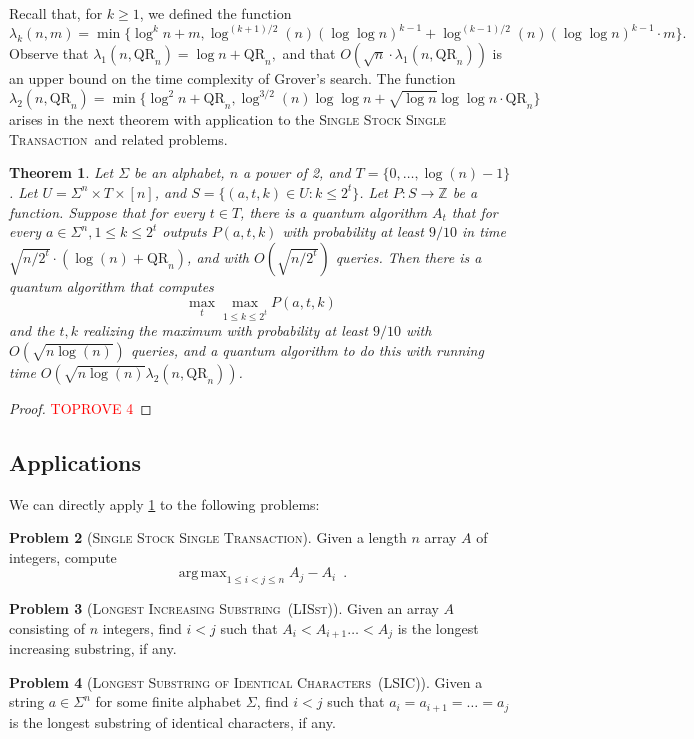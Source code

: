 \documentclass[12pt]{article}
\newcommand{\qr}{\mathrm{QR}}
\newcommand{\Z}{\mathbb{Z}}
\DeclareMathOperator*{\argmax}{arg\,max}
\newcommand{\SSSTf}{\textsc{Single Stock Single Transaction}}
\newcommand{\LSICf}{\textsc{Longest Substring of Identical Characters}}
\newcommand{\LSIC}{\textsc{LSIC}}
\newcommand{\LISstf}{\textsc{Longest Increasing Substring}}
\newcommand{\LISst}{\textsc{LISst}}
\newtheorem{theorem}{Theorem}
\theoremstyle{definition}
\newtheorem{problem}[theorem]{Problem}
\begin{document}
Recall that, for $k \geq 1$, we defined the function
\[
\lambda_k (n, m) = \min \{\log^k n + m, \log^{(k+1)/2} (n) (\log \log n)^{k-1} + \log^{(k-1)/2} (n) (\log \log n)^{k-1} \cdot m \}.
\]
Observe that  $\lambda_1 (n, \qr_n) =  \log n + \qr_n,$ and that $O(\sqrt{n} \cdot \lambda_1 (n, \qr_n) )$ is an upper bound on the time complexity of Grover's search.
The function 
\[
\lambda_2 (n, \qr_n) = \min \{\log^2 n + \qr_n , \log^{3/2} (n) \log \log n + \sqrt{\log n} \log \log n \cdot \qr_n \}
\]
arises in the next theorem with application to the \SSSTf \ and related problems.
\begin{theorem}
\label{thm:bu_rootn}
Let $\Sigma$ be an alphabet, $n$ a power of 2, and $T = \{0, \ldots, \log(n) - 1\}$.
Let $U = \Sigma^n \times T \times [n]$, and $S = \{(a, t, k) \in U : k \le 2^t\}$.
Let $P : S \rightarrow \Z$ be a function.  Suppose that for every $t \in T$, there is a quantum algorithm $A_t$ that for every $a \in \Sigma^n, 1 \le k \le 2^t$ outputs $P(a, t, k)$ with probability at least $9/10$ in time $\sqrt{n/2^t} \cdot (\log(n) + \qr_n)$, and with $O(\sqrt{n/2^t})$ queries.  Then there is a quantum algorithm that computes 
\[
\max_t \max_{1 \le k \le 2^t} P(a, t, k)
\]
and the $t,k$ realizing the maximum with probability at least $9/10$ with $O(\sqrt{n \log(n)})$ queries, and a quantum algorithm to do this with running time $O(\sqrt{n \log(n)} \lambda_2(n, \qr_n))$.
\end{theorem}

\begin{proof}\textcolor{red}{TOPROVE 4}\end{proof}

\subsection{Applications}
We can directly apply \cref{thm:bu_rootn} to the following problems:

\begin{problem}[\SSSTf]
Given a length $n$ array $A$ of integers, compute 
\[
\argmax_{1 \leq i < j \leq n} A_j - A_i \enspace .
\]
\end{problem}

\begin{problem}[\LISstf \ (\LISst)]
Given an array $A$ consisting of $n$ integers, find $ i < j $ such that $A_i < A_{i+1} \ldots < A_j$ is the longest increasing substring, if any.
\end{problem}

\begin{problem}[\LSICf \ (\LSIC)]
Given a string $a \in \Sigma^n$ for some finite alphabet $\Sigma$, find $i<j$ such that $a_i = a_{i+1} = \ldots = a_j$ is the longest substring of identical characters, if any.
\end{problem}
\end{document}
